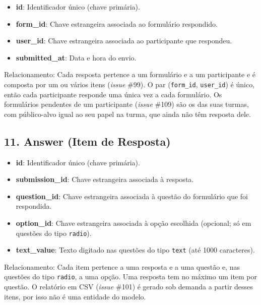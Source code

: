 \documentclass[a4paper,12pt]{article}
\begin{document}
\begin{itemize}

    \item \textbf{id}: Identificador único (chave primária).

    \item \textbf{form\_id}: Chave estrangeira associada ao formulário respondido.

    \item \textbf{user\_id}: Chave estrangeira associada ao participante que respondeu.

    \item \textbf{submitted\_at}: Data e hora do envio.

\end{itemize}

Relacionamento: Cada resposta pertence a um formulário e a um participante e é composta por um ou vários itens (\textit{issue} \#99). O par (\texttt{form\_id}, \texttt{user\_id}) é único, então cada participante responde uma única vez a cada formulário. Os formulários pendentes de um participante (\textit{issue} \#109) são os das suas turmas, com público-alvo igual ao seu papel na turma, que ainda não têm resposta dele.

\subsection*{11. Answer (Item de Resposta)}

\begin{itemize}

    \item \textbf{id}: Identificador único (chave primária).

    \item \textbf{submission\_id}: Chave estrangeira associada à resposta.

    \item \textbf{question\_id}: Chave estrangeira associada à questão do formulário que foi respondida.

    \item \textbf{option\_id}: Chave estrangeira associada à opção escolhida (opcional; só em questões do tipo \texttt{radio}).

    \item \textbf{text\_value}: Texto digitado nas questões do tipo \texttt{text} (até 1000 caracteres).

\end{itemize}

Relacionamento: Cada item pertence a uma resposta e a uma questão e, nas questões do tipo \texttt{radio}, a uma opção. Uma resposta tem no máximo um item por questão. O relatório em CSV (\textit{issue} \#101) é gerado sob demanda a partir desses itens, por isso não é uma entidade do modelo.
\end{document}

